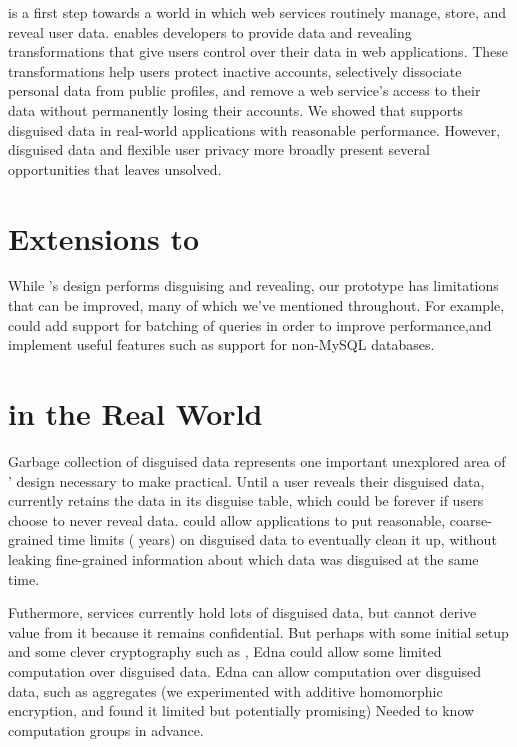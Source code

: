 %
\sys is a first step towards a world in which web services routinely manage,
store, and reveal \xxed user data.
%
\sys enables developers to provide data \xxing and revealing transformations
that give users control over their data in web applications.
%
These transformations help users protect inactive accounts, selectively
dissociate personal data from public profiles, and remove a web service's access
to their data without permanently losing their accounts.
%
We showed that \sys supports disguised data in real-world applications with
reasonable performance. However, disguised data and flexible user privacy more
broadly present several opportunities that \sys leaves unsolved.
%

\section{Extensions to \sys}
While \sys's design performs disguising and revealing, our \sys prototype has
limitations that can be improved, many of which we've mentioned throughout. 
%
For example, \sys could add support for batching of queries in order to improve
performance,and implement useful features such as support for non-MySQL
databases. 
%

\section{\sys in the Real World}
%
Garbage collection of disguised data represents one important unexplored area of
\sys' design necessary to make \sys practical. Until a user reveals their
disguised data, \sys currently retains the data in its disguise table, which
could be forever if users choose to never reveal data.
%
\sys could allow applications to put reasonable, coarse-grained time limits ( years) on disguised data to eventually clean it up, without leaking
fine-grained information about which data was disguised at the same time.

%
Futhermore, services currently hold lots of disguised data, but cannot derive
value from it because it remains confidential. But perhaps with some initial
setup and some clever cryptography such as ,
Edna could allow some limited computation over disguised data.
%
Edna can allow computation over disguised data, such as aggregates (we
experimented with additive homomorphic encryption, and found it limited but
potentially promising) Needed to know computation groups in advance.

